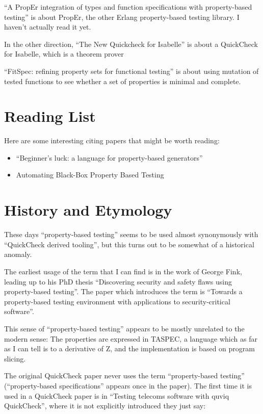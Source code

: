 ``A PropEr integration of types and function specifications with property-based testing''\cite{DBLP:conf/erlang/PapadakisS11} is about PropEr,
the other Erlang property-based testing library.
I haven't actually read it yet.

In the other direction, ``The New Quickcheck for Isabelle''\cite{DBLP:conf/cpp/Bulwahn12} is about a QuickCheck for Isabelle,
which is a theorem prover

``FitSpec: refining property sets for functional testing''\cite{DBLP:conf/haskell/BraquehaisR16} is about using mutation of tested functions to see whether a set of properties is minimal and complete.

\section{Reading List}

Here are some interesting citing papers that might be worth reading:

\begin{itemize}
\item ``Beginner's luck: a language for property-based generators''\cite{DBLP:conf/popl/LampropoulosGHH17}
\item Automating Black-Box Property Based Testing\cite{DBLP:phd/basesearch/Duregard16}
\end{itemize}

\section{History and Etymology}

These days ``property-based testing'' seems to be used almost synonymously with ``QuickCheck derived tooling'',
but this turns out to be somewhat of a historical anomaly.

The earliest usage of the term that I can find is in the work of George Fink,
leading up to his PhD thesis ``Discovering security and safety flaws using property-based testing''\cite{fink1996discovering}.
The paper which introduces the term is ``Towards a property-based testing environment with applications to security-critical software''\cite{fink1994towards}.

This sense of ``property-based testing'' appears to be mostly unrelated to the modern sense:
The properties are expressed in TASPEC,
a language which as far as I can tell is to a derivative of Z,
and the implementation is based on program slicing.

The original QuickCheck paper\cite{DBLP:conf/icfp/ClaessenH00} never uses the term ``property-based testing'' (``property-based specifications'' appears once in the paper).
The first time it is used in a QuickCheck paper is in ``Testing telecoms software with quviq QuickCheck''\cite{DBLP:conf/erlang/ArtsHJW06},
where it is not explicitly introduced they just say:

